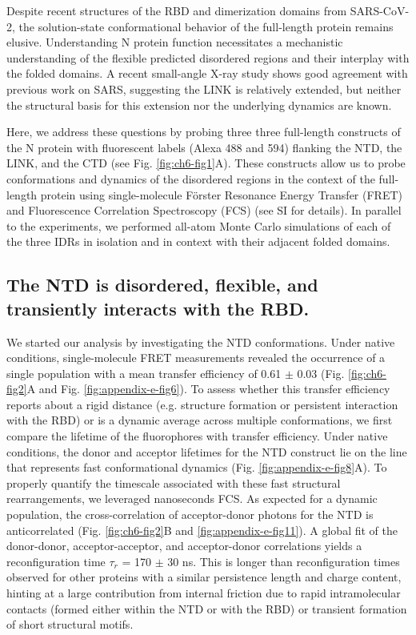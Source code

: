 \documentclass[../main.tex]{subfiles}
\begin{document}
        Despite recent structures of the RBD and dimerization domains from SARS-CoV-2, the solution-state conformational behavior of the full-length protein remains elusive\cite{Kang2020-tb,Zinzula2020-mi,Ye2020-fz}. Understanding N protein function necessitates a mechanistic understanding of the flexible predicted disordered regions and their interplay with the folded domains. A recent small-angle X-ray study shows good agreement with previous work on SARS, suggesting the LINK is relatively extended, but neither the structural basis for this extension nor the underlying dynamics are known\cite{Chang2009-vd,Zeng2020-cw}.

        Here, we address these questions by probing three three full-length constructs of the N protein with fluorescent labels (Alexa 488 and 594) flanking the NTD, the LINK, and the CTD (see Fig. \ref{fig:ch6-fig1}A). These constructs allow us to probe conformations and dynamics of the disordered regions in the context of the full-length protein using single-molecule Förster Resonance Energy Transfer (FRET) and Fluorescence Correlation Spectroscopy (FCS) (see SI for details). In parallel to the experiments, we performed all-atom Monte Carlo simulations of each of the three IDRs in isolation and in context with their adjacent folded domains. 

    \subsection{The NTD is disordered, flexible, and transiently interacts with the RBD.}
        We started our analysis by investigating the NTD conformations. Under native conditions, single-molecule FRET measurements revealed the occurrence of a single population with a mean transfer efficiency of 0.61 $\pm$ 0.03 (Fig. \ref{fig:ch6-fig2}A and Fig. \ref{fig:appendix-e-fig6}). To assess whether this transfer efficiency reports about a rigid distance (e.g. structure formation or persistent interaction with the RBD) or is a dynamic average across multiple conformations, we first compare the lifetime of the fluorophores with transfer efficiency. Under native conditions, the donor and acceptor lifetimes for the NTD construct lie on the line that represents  fast conformational dynamics (Fig. \ref{fig:appendix-e-fig8}A). To properly quantify the timescale associated with these fast structural rearrangements, we leveraged nanoseconds FCS. As expected for a dynamic population\cite{Nettels2009-uq,Soranno2012-jn}, the cross-correlation of acceptor-donor photons for the NTD is anticorrelated (Fig. \ref{fig:ch6-fig2}B and \ref{fig:appendix-e-fig11}). A global fit of the donor-donor, acceptor-acceptor, and acceptor-donor correlations yields a reconfiguration time $\tau _r$ = 170 $\pm$ 30 ns. This is longer than reconfiguration times observed for other proteins with a similar persistence length and charge content\cite{Soranno2012-jn,Borgia2012-tz,Schuler2016-wh,Soranno2018-iw}, hinting at a large contribution from internal friction due to rapid intramolecular contacts (formed either within the NTD or with the RBD) or transient formation of short structural motifs\cite{Soranno2017-bi}. 
\end{document}
